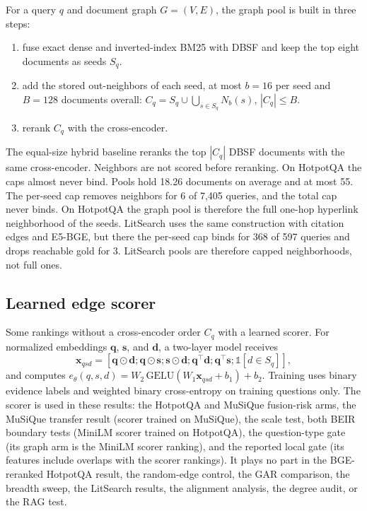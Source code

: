 \documentclass[10pt,twocolumn]{article}
\begin{document}
For a query $q$ and document graph $G=(V,E)$, the graph pool is built in three
steps:
\begin{enumerate}
  \item fuse exact dense and inverted-index BM25 with DBSF
    \citep{qdrant2026dbsf} and keep the top eight documents as seeds $S_q$.
  \item add the stored out-neighbors of each seed, at most $b=16$ per seed and
    $B=128$ documents overall:
    $C_q=S_q\cup\bigcup_{s\in S_q}N_b(s)$, $|C_q|\le B$.
  \item rerank $C_q$ with the cross-encoder.
\end{enumerate}
The equal-size hybrid baseline reranks the top $|C_q|$ DBSF documents with the
same cross-encoder. Neighbors are not scored before reranking. On HotpotQA the
caps almost never bind. Pools hold 18.26 documents on average and at most 55.
The per-seed cap removes neighbors for 6 of 7,405 queries, and the total cap
never binds. On HotpotQA the graph pool is therefore the full one-hop
hyperlink neighborhood of the seeds. LitSearch uses the same construction with
citation edges and E5-BGE, but there the per-seed cap binds for 368 of 597
queries and drops reachable gold for 3. LitSearch pools are therefore capped
neighborhoods, not full ones.

\subsection{Learned edge scorer}

Some rankings without a cross-encoder order $C_q$ with a learned scorer. For
normalized embeddings $\mathbf q$, $\mathbf s$, and $\mathbf d$, a two-layer
model receives
\begin{equation}
  \mathbf x_{qsd}=[\mathbf q\odot\mathbf d;
  \mathbf q\odot\mathbf s;\mathbf s\odot\mathbf d;
  \mathbf q^\top\mathbf d;\mathbf q^\top\mathbf s;
  \mathbb{1}[d\in S_q]],
\end{equation}
and computes $e_\theta(q,s,d)=W_2\,\mathrm{GELU}(W_1\mathbf
x_{qsd}+b_1)+b_2$. Training uses binary evidence labels and weighted binary
cross-entropy on training questions only. The scorer is used in these results: the HotpotQA and
MuSiQue fusion-risk arms, the MuSiQue transfer result (scorer trained on
MuSiQue), the scale test, both BEIR boundary tests (MiniLM scorer trained on
HotpotQA), the question-type gate (its graph arm is the MiniLM scorer ranking),
and the reported local gate (its features include overlaps with the scorer
rankings). It plays no part in the BGE-reranked HotpotQA result, the
random-edge control, the GAR comparison, the breadth sweep, the LitSearch
results, the alignment analysis, the degree audit, or the RAG test.
\end{document}
